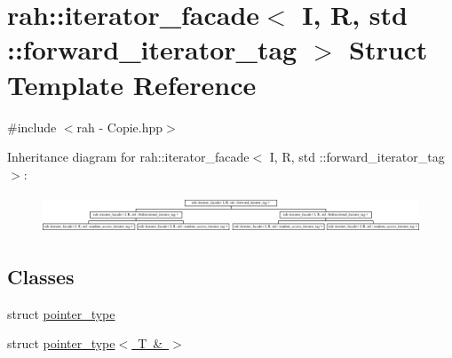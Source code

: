 \hypertarget{structrah_1_1iterator__facade_3_01_i_00_01_r_00_01std_01_1_1forward__iterator__tag_01_4}{}\section{rah\+::iterator\+\_\+facade$<$ I, R, std \+::forward\+\_\+iterator\+\_\+tag $>$ Struct Template Reference}
\label{structrah_1_1iterator__facade_3_01_i_00_01_r_00_01std_01_1_1forward__iterator__tag_01_4}


{\ttfamily \#include $<$rah -\/ Copie.\+hpp$>$}

Inheritance diagram for rah\+::iterator\+\_\+facade$<$ I, R, std \+::forward\+\_\+iterator\+\_\+tag $>$\+:\begin{figure}[H]
\begin{center}
\leavevmode
\includegraphics[height=1.132076cm]{structrah_1_1iterator__facade_3_01_i_00_01_r_00_01std_01_1_1forward__iterator__tag_01_4}
\end{center}
\end{figure}
\subsection*{Classes}
\begin{DoxyCompactItemize}
\item 
struct \mbox{\hyperlink{structrah_1_1iterator__facade_3_01_i_00_01_r_00_01std_01_1_1forward__iterator__tag_01_4_1_1pointer__type}{pointer\+\_\+type}}
\item 
struct \mbox{\hyperlink{structrah_1_1iterator__facade_3_01_i_00_01_r_00_01std_01_1_1forward__iterator__tag_01_4_1_1pointer__type_3_01_t_01_6_01_4}{pointer\+\_\+type$<$ T \& $>$}}
\end{DoxyCompactItemize}
